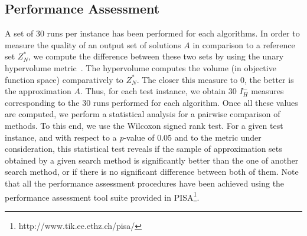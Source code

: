 \documentclass[a4paper,10pt]{article}
\begin{document}
 
\subsection{Performance Assessment}
 A set of 30 runs per instance has been performed for each algorithms.
In order to measure the quality of an output set of solutions $A$ in comparison to a reference set $Z^*_N$, we compute the difference between these two sets by using the unary hypervolume
metric~\cite{Zitzler2004}. The hypervolume computes the volume (in objective function space) comparatively to $Z^*_N$. The closer this measure to 0, the better is the approximation $A$.
Thus, for each test instance, we obtain 30 $I^-_H $ measures  corresponding to the 30  runs performed for each algorithm. 
Once all these values are computed, we perform a statistical analysis for a pairwise comparison of methods. To this end, we use the Wilcoxon signed rank test. For a given
test instance, and with respect to a \textit{p}-value of 0.05 and to the metric under consideration, this statistical test reveals if
the sample of approximation sets obtained by a given search method is significantly better than the one of another search
method, or if there is no significant difference between both of them. Note that all the performance assessment procedures have been achieved using
the performance assessment tool suite provided in PISA\footnote{http://www.tik.ee.ethz.ch/pisa/}.%
\end{document}
